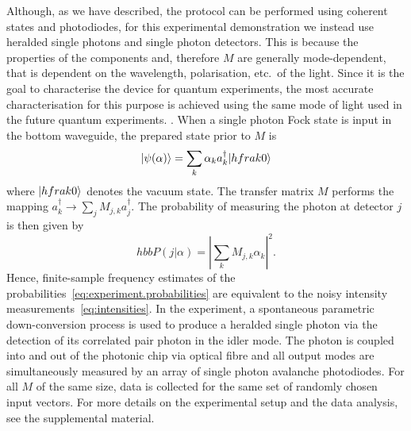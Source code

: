 Although, as we have described, the protocol can be performed using coherent states and photodiodes, for this experimental demonstration we instead use heralded single photons and single photon detectors.
This is because the properties of the components and, therefore $ M$ are generally mode-dependent, that is dependent on the wavelength, polarisation, etc.\ of the light.
Since it is the goal to characterise the device for quantum experiments, the most accurate characterisation for this purpose is achieved using the same mode of light used in the future quantum experiments. .
When a single photon Fock state is input in the bottom waveguide, the prepared state prior to $ M$ is
\begin{equation}
  \ket{\psi({\alpha})} = \sum_k \alpha_k a_k^{\dag} \ket{hfrak{0}}
\end{equation}
where $\ket{hfrak{0}}$ denotes the vacuum state.
The transfer matrix $M$ performs the mapping $a_k^{\dag} \rightarrow \sum_j M_{j,k}a_j^{\dag}$.
The probability of measuring the photon at detector $j$ is then given by
\begin{equation}
  hbb{P}(j|{\alpha}) = \left| \sum_k M_{j,k} \alpha_k \right|^2.
  \label{eq:experiment.probabilities}
\end{equation}
Hence, finite-sample frequency estimates of the probabilities~\eqref{eq:experiment.probabilities} are equivalent to the noisy intensity measurements~\eqref{eq:intensities}.
In the experiment, a spontaneous parametric down-conversion process is used to produce a heralded single photon via the detection of its correlated pair photon in the idler mode.
The photon is coupled into and out of the photonic chip via optical fibre and all output modes are simultaneously measured by an array of single photon avalanche photodiodes.
For all $ M$ of the same size, data is collected for the same set of randomly chosen input vectors.
For more details on the experimental setup and the data analysis, see the supplemental material.\\



